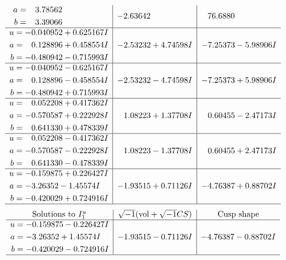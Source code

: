 \documentclass[1p]{elsarticle_modified}
\theoremstyle{definition}
\newcommand{\I}{\sqrt{-1}}
\begin{document}
$$\begin{array}{c|c|c}
\begin{aligned}
a &= \phantom{-}3.78562\phantom{ +0.000000I} \\
b &= \phantom{-}3.39066\phantom{ +0.000000I}\end{aligned}
 & -2.63642\phantom{ +0.000000I} & \phantom{-}76.6880\phantom{ +0.000000I} \\ \hline\begin{aligned}
u &= -0.040952 + 0.625167 I \\
a &= \phantom{-}0.128896 + 0.458554 I \\
b &= -0.480942 - 0.715993 I\end{aligned}
 & -2.53232 + 4.74598 I & -7.25373 - 5.98906 I \\ \hline\begin{aligned}
u &= -0.040952 - 0.625167 I \\
a &= \phantom{-}0.128896 - 0.458554 I \\
b &= -0.480942 + 0.715993 I\end{aligned}
 & -2.53232 - 4.74598 I & -7.25373 + 5.98906 I \\ \hline\begin{aligned}
u &= \phantom{-}0.052208 + 0.417362 I \\
a &= -0.570587 + 0.222928 I \\
b &= \phantom{-}0.641330 + 0.478339 I\end{aligned}
 & \phantom{-}1.08223 + 1.37708 I & \phantom{-}0.60455 - 2.47173 I \\ \hline\begin{aligned}
u &= \phantom{-}0.052208 - 0.417362 I \\
a &= -0.570587 - 0.222928 I \\
b &= \phantom{-}0.641330 - 0.478339 I\end{aligned}
 & \phantom{-}1.08223 - 1.37708 I & \phantom{-}0.60455 + 2.47173 I \\ \hline\begin{aligned}
u &= -0.159875 + 0.226427 I \\
a &= -3.26352 - 1.45574 I \\
b &= -0.420029 + 0.724916 I\end{aligned}
 & -1.93515 + 0.71126 I & -4.76387 + 0.88702 I\\
 \hline 
 \end{array}$$\newpage$$\begin{array}{c|c|c}  
\text{Solutions to }I^u_{1}& \I (\text{vol} + \sqrt{-1}CS) & \text{Cusp shape}\\
 \hline 
\begin{aligned}
u &= -0.159875 - 0.226427 I \\
a &= -3.26352 + 1.45574 I \\
b &= -0.420029 - 0.724916 I\end{aligned}
 & -1.93515 - 0.71126 I & -4.76387 - 0.88702 I\\
 \hline 
 \end{array}$$\newpage\newpage\renewcommand{\arraystretch}{1}
\end{document}
